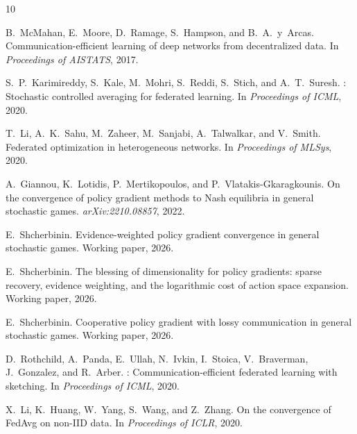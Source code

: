 \documentclass[11pt,a4paper]{article}
\begin{document}

\begin{thebibliography}{10}

B.~McMahan, E.~Moore, D.~Ramage, S.~Hampson, and B.~A.~y~Arcas.
\newblock Communication-efficient learning of deep networks from decentralized
  data.
\newblock In \emph{Proceedings of AISTATS}, 2017.

S.~P.~Karimireddy, S.~Kale, M.~Mohri, S.~Reddi, S.~Stich, and A.~T.~Suresh.
: Stochastic controlled averaging for federated learning.
\newblock In \emph{Proceedings of ICML}, 2020.

T.~Li, A.~K.~Sahu, M.~Zaheer, M.~Sanjabi, A.~Talwalkar, and V.~Smith.
\newblock Federated optimization in heterogeneous networks.
\newblock In \emph{Proceedings of MLSys}, 2020.

A.~Giannou, K.~Lotidis, P.~Mertikopoulos, and
  P.~Vlatakis-Gkaragkounis.
\newblock On the convergence of policy gradient methods to {N}ash equilibria in
  general stochastic games.
\newblock \emph{arXiv:2210.08857}, 2022.

E.~Shcherbinin.
\newblock Evidence-weighted policy gradient convergence in general stochastic
  games.
\newblock Working paper, 2026.

E.~Shcherbinin.
\newblock The blessing of dimensionality for policy gradients: sparse recovery,
  evidence weighting, and the logarithmic cost of action space expansion.
\newblock Working paper, 2026.

E.~Shcherbinin.
\newblock Cooperative policy gradient with lossy communication in general
  stochastic games.
\newblock Working paper, 2026.

D.~Rothchild, A.~Panda, E.~Ullah, N.~Ivkin, I.~Stoica,
  V.~Braverman, J.~Gonzalez, and R.~Arber.
: Communication-efficient federated learning with
  sketching.
\newblock In \emph{Proceedings of ICML}, 2020.

X.~Li, K.~Huang, W.~Yang, S.~Wang, and Z.~Zhang.
\newblock On the convergence of {FedAvg} on non-{IID} data.
\newblock In \emph{Proceedings of ICLR}, 2020.

\end{thebibliography}
\end{document}
